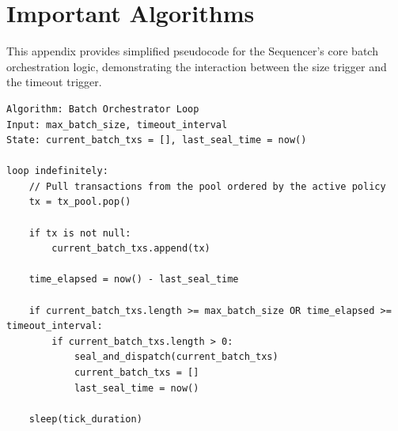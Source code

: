 \chapter{Important Algorithms}
\label{app:algorithms}
This appendix provides simplified pseudocode for the Sequencer's core batch orchestration logic, demonstrating the interaction between the size trigger and the timeout trigger.

\begin{lstlisting}[style=yamlStyle]
Algorithm: Batch Orchestrator Loop
Input: max_batch_size, timeout_interval
State: current_batch_txs = [], last_seal_time = now()

loop indefinitely:
    // Pull transactions from the pool ordered by the active policy
    tx = tx_pool.pop()
    
    if tx is not null:
        current_batch_txs.append(tx)
    
    time_elapsed = now() - last_seal_time
    
    if current_batch_txs.length >= max_batch_size OR time_elapsed >= timeout_interval:
        if current_batch_txs.length > 0:
            seal_and_dispatch(current_batch_txs)
            current_batch_txs = []
            last_seal_time = now()
    
    sleep(tick_duration)
\end{lstlisting}